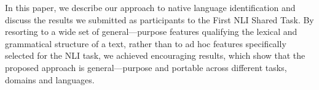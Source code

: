 In this paper, we describe our approach to native language identification and discuss the results we submitted as participants to the First NLI Shared Task.
 By resorting to a wide set of general---purpose features qualifying the lexical
 and grammatical structure of a text, rather than to ad hoc features
 specifically selected for the NLI task, we achieved encouraging results, which
 show that the proposed approach is general---purpose and portable across
 different tasks, domains and languages.

